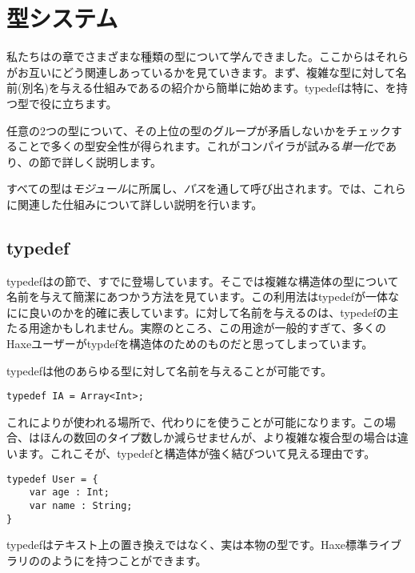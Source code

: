 \chapter{型システム}
\label{type-system}

私たちはの章でさまざまな種類の型について学んできました。ここからはそれらがお互いにどう関連しあっているかを見ていきます。まず、複雑な型に対して名前(別名)を与える仕組みであるの紹介から簡単に始めます。typedefは特に、を持つ型で役に立ちます。

任意の2つの型について、その上位の型のグループが矛盾しないかをチェックすることで多くの型安全性が得られます。これがコンパイラが試みる\emph{単一化}であり、の節で詳しく説明します。

すべての型は\emph{モジュール}に所属し、\emph{パス}を通して呼び出されます。では、これらに関連した仕組みについて詳しい説明を行います。

\section{typedef}
\label{type-system-typedef}

typedefはの節で、すでに登場しています。そこでは複雑な構造体の型について名前を与えて簡潔にあつかう方法を見ています。この利用法はtypedefが一体なにに良いのかを的確に表しています。に対して名前を与えるのは、typedefの主たる用途かもしれません。実際のところ、この用途が一般的すぎて、多くのHaxeユーザーがtypdefを構造体のためのものだと思ってしまっています。

typedefは他のあらゆる型に対して名前を与えることが可能です。

\begin{lstlisting}
typedef IA = Array<Int>;
\end{lstlisting}

これによりが使われる場所で、代わりにを使うことが可能になります。この場合、はほんの数回のタイプ数しか減らせませんが、より複雑な複合型の場合は違います。これこそが、typedefと構造体が強く結びついて見える理由です。

\begin{lstlisting}
typedef User = {
    var age : Int;
    var name : String;
}
\end{lstlisting}

typedefはテキスト上の置き換えではなく、実は本物の型です。Haxe標準ライブラリののようにを持つことができます。

